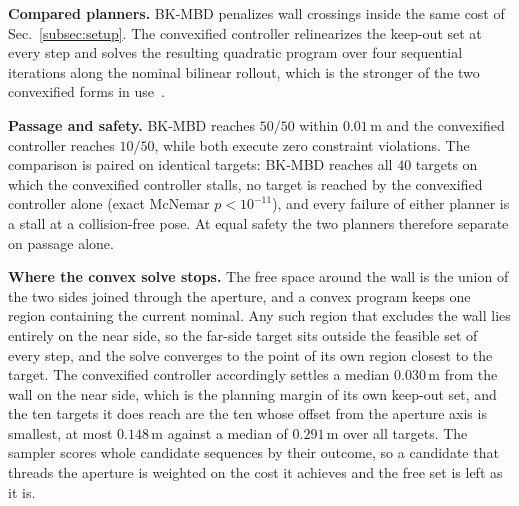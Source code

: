 \documentclass[letterpaper,10pt,conference]{ieeeconf}
\newcommand{\bkmbd}{\textsc{BK-MBD}}
\begin{document}
\textbf{Compared planners.}
\bkmbd{} penalizes wall crossings inside the same cost of Sec.~\ref{subsec:setup}.
The convexified controller relinearizes the keep-out set at every step and solves the resulting quadratic program over four sequential iterations along the nominal bilinear rollout, which is the stronger of the two convexified forms in use~\cite{bruder2021bilinear}.

\textbf{Passage and safety.}
\bkmbd{} reaches $50/50$ within $0.01$\,m and the convexified controller reaches $10/50$, while both execute zero constraint violations.
The comparison is paired on identical targets: \bkmbd{} reaches all $40$ targets on which the convexified controller stalls, no target is reached by the convexified controller alone (exact McNemar $p < 10^{-11}$), and every failure of either planner is a stall at a collision-free pose.
At equal safety the two planners therefore separate on passage alone.

\textbf{Where the convex solve stops.}
The free space around the wall is the union of the two sides joined through the aperture, and a convex program keeps one region containing the current nominal.
Any such region that excludes the wall lies entirely on the near side, so the far-side target sits outside the feasible set of every step, and the solve converges to the point of its own region closest to the target.
The convexified controller accordingly settles a median $0.030$\,m from the wall on the near side, which is the planning margin of its own keep-out set, and the ten targets it does reach are the ten whose offset from the aperture axis is smallest, at most $0.148$\,m against a median of $0.291$\,m over all targets.
The sampler scores whole candidate sequences by their outcome, so a candidate that threads the aperture is weighted on the cost it achieves and the free set is left as it is.
\end{document}
